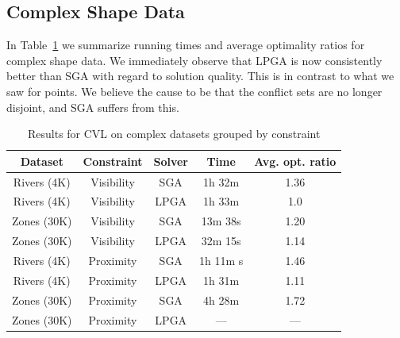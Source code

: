 \subsection{Complex Shape Data}
\label{sec:exp:complex:shapes}

In Table~\ref{tab:complex:overview} we summarize running times and average optimality ratios for complex shape data. We immediately observe that LPGA is now consistently better than SGA with regard to solution quality. This is in contrast to what we saw for points. We believe the cause to be that the conflict sets are no longer disjoint, and SGA suffers from this.

\begin{table}[htdp]
\caption{Results for CVL on complex datasets grouped by constraint}
\vspace{-2ex}
\begin{center}
\begin{tabular}{|c|c|c|c|c|}
\hline
\textbf{Dataset} & \textbf{Constraint} & \textbf{Solver} & \textbf{Time} & \textbf{Avg. opt. ratio}\\ 
\hline
Rivers (4K) & Visibility & SGA & 1h 32m & 1.36 \\
Rivers (4K) & Visibility & LPGA & 1h 33m & 1.0 \\
Zones (30K) & Visibility & SGA & 13m 38s & 1.20 \\
Zones (30K) & Visibility & LPGA & 32m 15s & 1.14 \\
\hline
Rivers (4K)  & Proximity  & SGA& 1h 11m s & 1.46 \\
Rivers (4K)  & Proximity & LPGA & 1h 31m & 1.11 \\
Zones (30K) & Proximity & SGA & 4h 28m & 1.72 \\
Zones (30K) & Proximity & LPGA & --- & --- \\
\hline
\end{tabular}
\end{center}
\label{tab:complex:overview}
\vspace{-6ex}
\end{table}%

